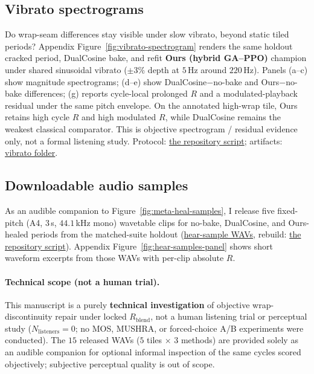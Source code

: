 
\subsection{Vibrato spectrograms}
\label{sec:vibrato-eval}

Do wrap-seam differences stay visible under slow vibrato, beyond static tiled periods?
Appendix Figure~\ref{fig:vibrato-spectrogram} renders the same holdout cracked period, DualCosine bake, and refit \textbf{Ours (hybrid GA--PPO)} champion under shared sinusoidal vibrato ($\pm 3\%$ depth at $5$\,Hz around $220$\,Hz).
Panels (a--c) show magnitude spectrograms; (d--e) show DualCosine$-$no-bake and Ours$-$no-bake differences; (g) reports cycle-local prolonged $R$ and a modulated-playback residual under the same pitch envelope.
On the annotated high-wrap tile, Ours retains high cycle $R$ and high modulated $R$, while DualCosine remains the weakest classical comparator.
This is objective spectrogram / residual evidence only, not a formal listening study.
Protocol:
\href{https://github.com/reeldemo/denoise-opt}{the repository script};
artifacts:
\href{https://github.com/reeldemo/denoise-opt}{vibrato folder}.

\subsection{Downloadable audio samples}
\label{sec:hear-samples}

As an audible companion to Figure~\ref{fig:meta-heal-samples}, I release five fixed-pitch (A4, $3$\,s, $44.1$\,kHz mono) wavetable clips for no-bake, DualCosine, and Ours-healed periods from the matched-suite holdout
(\href{https://github.com/reeldemo/denoise-opt}{hear-sample WAVs},
rebuild:
\href{https://github.com/reeldemo/denoise-opt}{the repository script}).
Appendix Figure~\ref{fig:hear-samples-panel} shows short waveform excerpts from those WAVs with per-clip absolute $R$.

\paragraph{Technical scope (not a human trial).}
This manuscript is a purely \textbf{technical investigation} of objective wrap-discontinuity repair under locked $R_{\mathrm{blend}}$, not a human listening trial or perceptual study ($N_{\mathrm{listeners}}{=}0$; no MOS, MUSHRA, or forced-choice A/B experiments were conducted).
The $15$ released WAVs ($5$ tiles $\times$ $3$ methods) are provided solely as an audible companion for optional informal inspection of the same cycles scored objectively; subjective perceptual quality is out of scope.

